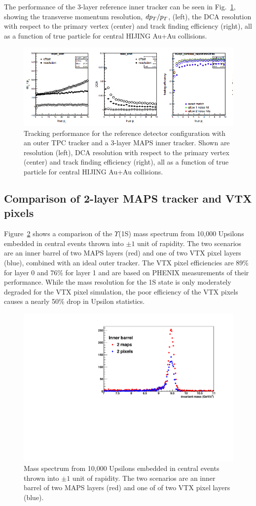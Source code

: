 The performance of the 3-layer reference inner tracker can be seen in Fig.~\ref{fig:tracking_reference}, showing the 
transverse momentum resolution, $d\mbox{${p_T}$}/\mbox{${p_T}$}$, (left), the DCA resolution with respect to the primary vertex (center) 
and track finding efficiency (right), all as a function of true particle \pt for central HIJING Au+Au collisions. 
\begin{figure}[hbt]
  \centering
  \includegraphics[width=0.9\linewidth]{figs/tracking_performance_reference}
  \caption{Tracking performance for the reference detector configuration with an
  outer TPC tracker and a 3-layer MAPS inner tracker. Shown are \pt resolution (left), 
  DCA resolution with respect to the primary vertex (center) and track finding efficiency (right), all as a function
of true particle \pt for central HIJING Au+Au collisions.}
  \label{fig:tracking_reference}
\end{figure}

\subsection{Comparison of 2-layer MAPS tracker and VTX pixels} 

Figure~\ref{fig:ups1s_recomass_comparison} shows a comparison of the
$\Upsilon$(1S) mass spectrum from 10,000 Upsilons embedded in central
\hijing events thrown into $\pm1$ unit of rapidity. The two scenarios
are an inner barrel of two MAPS layers (red) and one of two VTX
pixel layers (blue), combined with an ideal outer tracker.  
The VTX pixel efficiencies are 89\% for layer 0 and 76\% for layer 1 and are based
on PHENIX measurements of their performance. While the mass resolution for the 1S state is
only moderately degraded for the VTX pixel simulation, 
the poor efficiency of the VTX pixels causes a nearly 50\% 
drop in Upsilon statistics.
\begin{figure}[hbt]
  \centering
  \includegraphics[width=0.5\linewidth]{figs/ups1s_recomass_comparison}
  \caption{Mass spectrum from 10,000 Upsilons embedded in central
\hijing events thrown into $\pm1$ unit of rapidity. The two scenarios
are an inner barrel of two MAPS layers (red) and one of of two VTX
pixel layers (blue).}
\label{fig:ups1s_recomass_comparison}
\end{figure}

